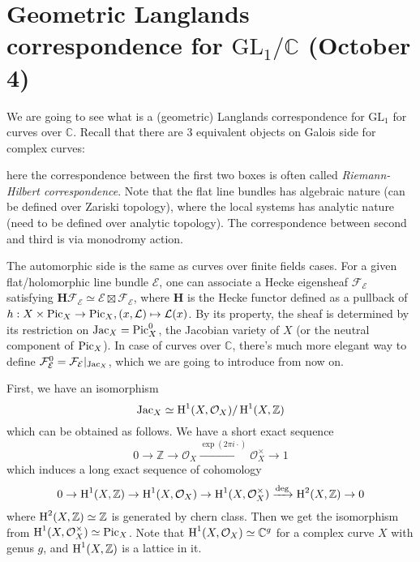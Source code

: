 \newpage
\section{Geometric Langlands correspondence for $\mathrm{GL}_{1}/\mathbb{C}$ (October 4)}

We are going to see what is a (geometric) Langlands correspondence for $\mathrm{GL}_1$ for
curves over $\mathbb{C}$.
Recall that there are 3 equivalent objects on Galois side for complex curves:

\begin{center}
\end{center}
here the correspondence between the first two boxes is often called \emph{Riemann-Hilbert correspondence}.
Note that the flat line bundles has algebraic nature (can be defined over Zariski topology), where
the local systems has analytic nature (need to be defined over analytic topology).
The correspondence between second and third is via monodromy action.

The automorphic side is the same as curves over finite fields cases.
For a given flat/holomorphic line bundle $\mathcal{E}$, one can associate a Hecke eigensheaf
$\mathcal{F}_{\mathcal{E}}$ satisfying $\mathbf{H}\mathcal{F}_{\mathcal{E}} \simeq \mathcal{E} \boxtimes \mathcal{F}_{\mathcal{E}}$,
where $\mathbf{H}$ is the Hecke functor defined as a pullback of $h: X \times \operatorname{\mathrm{Pic}}_X \to \operatorname{\mathrm{Pic}}_X, (x, \mathcal{L}) \mapsto \mathcal{L}(x)$.
By its property, the sheaf is determined by its restriction on $\operatorname{\mathrm{Jac}}_X = \operatorname{\mathrm{Pic}}_X^0$, the Jacobian variety of $X$
(or the neutral component of $\operatorname{\mathrm{Pic}}_X$).
In case of curves over $\mathbb{C}$, there's much more elegant way to define $\mathcal{F}_{\mathcal{E}}^{0} = \mathcal{F}_{\mathcal{E}} |_{\operatorname{\mathrm{Jac}}_X}$,
which we are going to introduce from now on.

First, we have an isomorphism
$$
\operatorname{\mathrm{Jac}}_X \simeq \operatorname{\mathrm{H}}^{1}(X, \mathcal{O}_X) / \operatorname{\mathrm{H}}^{1}(X, \mathbb{Z})
$$
which can be obtained as follows.
We have a short exact sequence
$$
0 \to \mathbb{Z} \to \mathcal{O}_X \xrightarrow{\exp(2\pi i\cdot)} \mathcal{O}_X^{\times} \to 1
$$
which induces a long exact sequence of cohomology
$$
0 \to \operatorname{\mathrm{H}}^{1}(X, \mathbb{Z}) \to \operatorname{\mathrm{H}}^1(X, \mathcal{O}_X) \to \operatorname{\mathrm{H}}^{1}(X, \mathcal{O}_X^{\times}) \xrightarrow{\mathrm{deg}} \operatorname{\mathrm{H}}^{2}(X, \mathbb{Z}) \to 0
$$
where $\operatorname{\mathrm{H}}^{2}(X, \mathbb{Z}) \simeq \mathbb{Z}$ is generated by chern class.
Then we get the isomorphism from $\operatorname{\mathrm{H}}^{1}(X, \mathcal{O}_X^{\times}) \simeq \operatorname{\mathrm{Pic}}_X$.
Note that $\operatorname{\mathrm{H}}^{1}(X, \mathcal{O}_X) \simeq \mathbb{C}^{g}$ for a complex curve $X$ with genus $g$,
and $\operatorname{\mathrm{H}}^{1}(X, \mathbb{Z})$ is a lattice in it.

